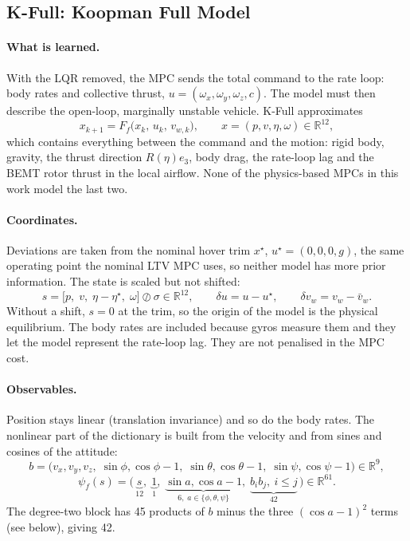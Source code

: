 \documentclass[11pt,a4paper]{article}
\newcommand{\KFull}{\textsf{K-Full}}          %
\begin{document}
	\subsection{\KFull: Koopman Full Model}
	\label{sec:kfull}

	\paragraph{What is learned.}
	With the LQR removed, the MPC sends the total command to the rate loop: body rates and
	collective thrust, $u = (\omega_x, \omega_y, \omega_z, c)$. The model must then describe the
	open-loop, marginally unstable vehicle.
	\KFull{} approximates
	\begin{equation}
		x_{k+1} = F_f\bigl(x_k,\, u_k,\, v_{w,k}\bigr), \qquad x = (p, v, \eta, \omega) \in \mathbb{R}^{12},
		\label{eqn:kfull-true}
	\end{equation}
	which contains everything between the command and the motion: rigid body, gravity, the thrust
	direction $R(\eta)e_3$, body drag, the rate-loop lag and the BEMT rotor thrust in the local airflow.
	None of the physics-based MPCs in this work model the last two.

	\paragraph{Coordinates.}
	Deviations are taken from the nominal hover trim $x^\star$, $u^\star = (0, 0, 0, g)$, the same
	operating point the nominal LTV MPC uses, so neither model has more prior information.
	The state is scaled but not shifted:
	\begin{equation}
		s = \bigl[p,\; v,\; \eta - \eta^\star,\; \omega\bigr] \oslash \sigma \in \mathbb{R}^{12},
		\qquad \delta u = u - u^\star, \qquad \delta v_w = v_w - \bar{v}_w .
	\end{equation}
	Without a shift, $s = 0$ at the trim, so the origin of the model is the physical equilibrium.
	The body rates are included because gyros measure them and they let the model represent the
	rate-loop lag. They are not penalised in the MPC cost.

	\paragraph{Observables.}
	Position stays linear (translation invariance) and so do the body rates. The nonlinear part of
	the dictionary is built from the velocity and from sines and cosines of the attitude:
	\begin{equation}
		b = \bigl(v_x, v_y, v_z,\; \sin\phi, \cos\phi - 1,\; \sin\theta, \cos\theta - 1,\; \sin\psi, \cos\psi - 1\bigr) \in \mathbb{R}^{9},
	\end{equation}
	\begin{equation}
		\psi_f(s) = \bigl(\,\underbrace{s}_{12},\; \underbrace{1}_{1},\; \underbrace{\sin a, \cos a - 1}_{6,\; a \in \{\phi,\theta,\psi\}},\; \underbrace{b_i b_j,\ i \le j}_{42}\,\bigr) \in \mathbb{R}^{61}.
	\end{equation}
	The degree-two block has 45 products of $b$ minus the three $(\cos a - 1)^2$ terms (see below),
	giving 42.
\end{document}
